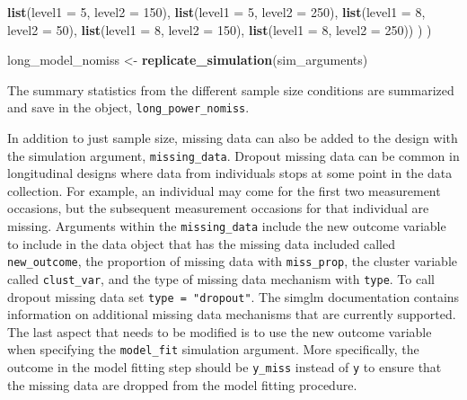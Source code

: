 \documentclass[man,mask,floatsintext]{apa6}
\newenvironment{Shaded}{\begin{snugshade}}{\end{snugshade}}
\newcommand{\DataTypeTok}[1]{\textcolor[rgb]{0.13,0.29,0.53}{#1}}
\newcommand{\DecValTok}[1]{\textcolor[rgb]{0.00,0.00,0.81}{#1}}
\newcommand{\KeywordTok}[1]{\textcolor[rgb]{0.13,0.29,0.53}{\textbf{#1}}}
\newcommand{\NormalTok}[1]{#1}
\newcommand{\OperatorTok}[1]{\textcolor[rgb]{0.81,0.36,0.00}{\textbf{#1}}}
\newcommand{\OtherTok}[1]{\textcolor[rgb]{0.56,0.35,0.01}{#1}}
\newcommand{\StringTok}[1]{\textcolor[rgb]{0.31,0.60,0.02}{#1}}
\begin{document}
\begin{Shaded}
\begin{Highlighting}[]
                       \KeywordTok{list}\NormalTok{(}\DataTypeTok{level1 =} \DecValTok{5}\NormalTok{, }\DataTypeTok{level2 =} \DecValTok{150}\NormalTok{),}
                       \KeywordTok{list}\NormalTok{(}\DataTypeTok{level1 =} \DecValTok{5}\NormalTok{, }\DataTypeTok{level2 =} \DecValTok{250}\NormalTok{),}
                       \KeywordTok{list}\NormalTok{(}\DataTypeTok{level1 =} \DecValTok{8}\NormalTok{, }\DataTypeTok{level2 =} \DecValTok{50}\NormalTok{),}
                       \KeywordTok{list}\NormalTok{(}\DataTypeTok{level1 =} \DecValTok{8}\NormalTok{, }\DataTypeTok{level2 =} \DecValTok{150}\NormalTok{),}
                       \KeywordTok{list}\NormalTok{(}\DataTypeTok{level1 =} \DecValTok{8}\NormalTok{, }\DataTypeTok{level2 =} \DecValTok{250}\NormalTok{))}
\NormalTok{  )}
\NormalTok{)}

\NormalTok{long_model_nomiss <-}\StringTok{ }\KeywordTok{replicate_simulation}\NormalTok{(sim_arguments) }
\end{Highlighting}
\end{Shaded}

The summary statistics from the different sample size conditions are summarized and save in the object, \texttt{long\_power\_nomiss}.

\begin{Shaded}
\end{Shaded}

In addition to just sample size, missing data can also be added to the design with the simulation argument, \texttt{missing\_data}. Dropout missing data can be common in longitudinal designs where data from individuals stops at some point in the data collection. For example, an individual may come for the first two measurement occasions, but the subsequent measurement occasions for that individual are missing. Arguments within the \texttt{missing\_data} include the new outcome variable to include in the data object that has the missing data included called \texttt{new\_outcome}, the proportion of missing data with \texttt{miss\_prop}, the cluster variable called \texttt{clust\_var}, and the type of missing data mechanism with \texttt{type}. To call dropout missing data set \texttt{type\ =\ "dropout"}. The simglm documentation contains information on additional missing data mechanisms that are currently supported. The last aspect that needs to be modified is to use the new outcome variable when specifying the \texttt{model\_fit} simulation argument. More specifically, the outcome in the model fitting step should be \texttt{y\_miss} instead of \texttt{y} to ensure that the missing data are dropped from the model fitting procedure.
\end{document}
